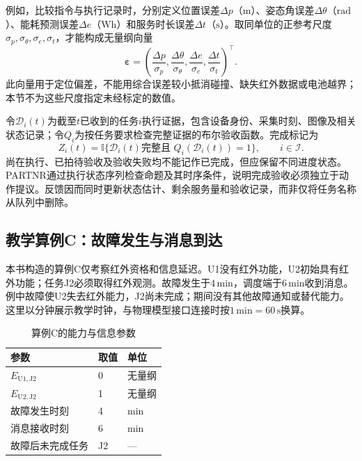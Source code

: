 例如，比较指令与执行记录时，分别定义位置误差$\Delta p$（$\mathrm m$）、姿态角误差$\Delta\theta$（$\mathrm{rad}$）、能耗预测误差$\Delta e$（$\mathrm{Wh}$）和服务时长误差$\Delta t$（$\mathrm s$）。取同单位的正参考尺度$\sigma_p,\sigma_\theta,\sigma_e,\sigma_t$，才能构成无量纲向量
\begin{equation}
\boldsymbol\varepsilon=
\left(\frac{\Delta p}{\sigma_p},\frac{\Delta\theta}{\sigma_\theta},
\frac{\Delta e}{\sigma_e},\frac{\Delta t}{\sigma_t}\right)^{\!\top}.
\label{s0409:normalized_error}
\end{equation}
此向量用于定位偏差，不能用综合误差较小抵消碰撞、缺失红外数据或电池越界；本节不为这些尺度指定未经标定的数值。

令$\mathcal D_i(t)$为截至$t$已收到的任务$i$执行证据，包含设备身份、采集时刻、图像及相关状态记录；令$Q_i$为按任务要求检查完整证据的布尔验收函数。完成标记为
\begin{equation}
Z_i(t)=\mathbb I\{\mathcal D_i(t)\text{完整且 }Q_i(\mathcal D_i(t))=1\},
\qquad i\in\mathcal I.
\label{s0409:completion}
\end{equation}
尚在执行、已拍待验收及验收失败均不能记作已完成，但应保留不同进度状态。PARTNR通过执行状态序列检查命题及其时序条件，说明完成验收必须独立于动作提议\cite{PARTNR2025}。反馈因而同时更新状态估计、剩余服务量和验收记录，而非仅将任务名称从队列中删除。

\subsection{教学算例C：故障发生与消息到达}

本书构造的算例C仅考察红外资格和信息延迟。U1没有红外功能，U2初始具有红外功能；任务J2必须取得红外观测。故障发生于$4\,\mathrm{min}$，调度端于$6\,\mathrm{min}$收到消息。例中故障使U2失去红外能力，J2尚未完成；期间没有其他故障通知或替代能力。这里以分钟展示教学时钟，与物理模型接口连接时按$1\,\mathrm{min}=60\,\mathrm s$换算。

\begin{table}[htbp]
\centering
\caption{算例C的能力与信息参数}
\label{s0409:case_parameters}
\begin{tabular}{lll}
\toprule
参数 & 取值 & 单位\\
\midrule
$E_{\mathrm{U1},\mathrm{J2}}$ & 0 & 无量纲\\
$E_{\mathrm{U2},\mathrm{J2}}$ & 1 & 无量纲\\
故障发生时刻 & 4 & $\mathrm{min}$\\
消息接收时刻 & 6 & $\mathrm{min}$\\
故障后未完成任务 & J2 & ---\\
\bottomrule
\end{tabular}
\end{table}

